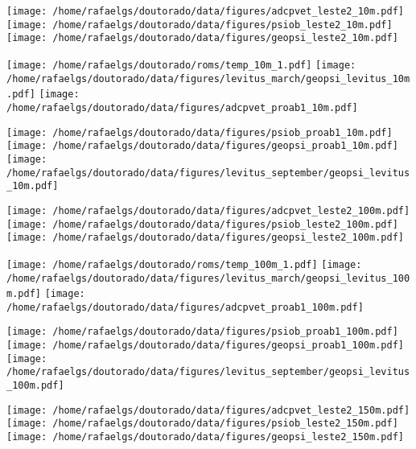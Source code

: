 \documentclass[12pt,portuguese,a4paper,pdftex]{article}
\begin{document}
\footnotesize
\pagestyle{plain}

\texttt{[image: /home/rafaelgs/doutorado/data/figures/adcpvet\_leste2\_10m.pdf]}
\texttt{[image: /home/rafaelgs/doutorado/data/figures/psiob\_leste2\_10m.pdf]}
\texttt{[image: /home/rafaelgs/doutorado/data/figures/geopsi\_leste2\_10m.pdf]}

\texttt{[image: /home/rafaelgs/doutorado/roms/temp\_10m\_1.pdf]}
\texttt{[image: /home/rafaelgs/doutorado/data/figures/levitus\_march/geopsi\_levitus\_10m.pdf]}
\texttt{[image: /home/rafaelgs/doutorado/data/figures/adcpvet\_proab1\_10m.pdf]}

\texttt{[image: /home/rafaelgs/doutorado/data/figures/psiob\_proab1\_10m.pdf]}
\texttt{[image: /home/rafaelgs/doutorado/data/figures/geopsi\_proab1\_10m.pdf]}
\texttt{[image: /home/rafaelgs/doutorado/data/figures/levitus\_september/geopsi\_levitus\_10m.pdf]}

\texttt{[image: /home/rafaelgs/doutorado/data/figures/adcpvet\_leste2\_100m.pdf]}
\texttt{[image: /home/rafaelgs/doutorado/data/figures/psiob\_leste2\_100m.pdf]}
\texttt{[image: /home/rafaelgs/doutorado/data/figures/geopsi\_leste2\_100m.pdf]}

\texttt{[image: /home/rafaelgs/doutorado/roms/temp\_100m\_1.pdf]}
\texttt{[image: /home/rafaelgs/doutorado/data/figures/levitus\_march/geopsi\_levitus\_100m.pdf]}
\texttt{[image: /home/rafaelgs/doutorado/data/figures/adcpvet\_proab1\_100m.pdf]}

\texttt{[image: /home/rafaelgs/doutorado/data/figures/psiob\_proab1\_100m.pdf]}
\texttt{[image: /home/rafaelgs/doutorado/data/figures/geopsi\_proab1\_100m.pdf]}
\texttt{[image: /home/rafaelgs/doutorado/data/figures/levitus\_september/geopsi\_levitus\_100m.pdf]}

\texttt{[image: /home/rafaelgs/doutorado/data/figures/adcpvet\_leste2\_150m.pdf]}
\texttt{[image: /home/rafaelgs/doutorado/data/figures/psiob\_leste2\_150m.pdf]}
\texttt{[image: /home/rafaelgs/doutorado/data/figures/geopsi\_leste2\_150m.pdf]}
\end{document}
